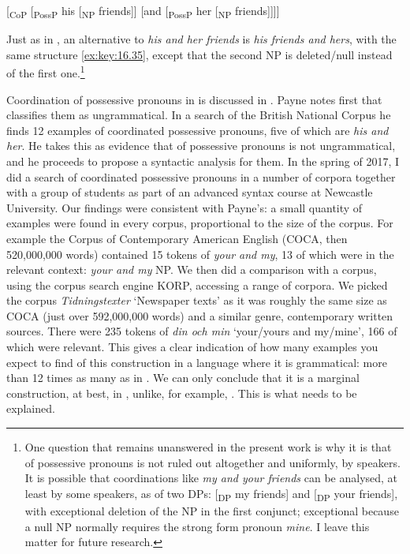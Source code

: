 \documentclass[output=paper]{langsci/langscibook}
\begin{document}
\ea\label{ex:key:16.35}
{}[\textsubscript{CoP} [\textsubscript{PossP} his [\textsubscript{NP} friends]] [and [\textsubscript{PossP} her [\textsubscript{NP} friends]]]]
\z

Just as in , an alternative to \emph{his and her friends} is \emph{his
friends and hers}, with the same structure \eqref{ex:key:16.35}, except that the second NP is
deleted/null instead of the first one.\footnote{ One question that remains
unanswered in the present work is why it is that  of possessive
pronouns is not ruled out altogether and uniformly, by  speakers. It is
possible that coordinations like \emph{my and your friends} can be analysed, at
least by some speakers, as  of two DPs: [\textsubscript{DP} my
friends] and [\textsubscript{DP} your friends], with exceptional deletion of
the NP in the first conjunct; exceptional because a null NP normally requires
the strong form pronoun \emph{mine}. I leave this matter for future research.}

Coordination of possessive pronouns in  is discussed in
\citet{Payne2011}. Payne notes first that \textcite{QuirkEtAl1972} classifies them as
ungrammatical. In a search of the British National Corpus he finds 12 examples
of coordinated possessive pronouns, five of which are \emph{his and her}. He
takes this as evidence that  of possessive pronouns is not
ungrammatical, and he proceeds to propose a syntactic analysis for them. In the
spring of 2017, I did a search of coordinated possessive pronouns in a number
of  corpora together with a group of students as part of an advanced
syntax course at Newcastle University. Our findings were consistent with
Payne’s: a small quantity of examples were found in every corpus, proportional
to the size of the corpus. For example the Corpus of Contemporary American
English (COCA, then 520,000,000 words) contained 15 tokens of \emph{your and
my}, 13 of which were in the relevant context: \emph{your and my} NP. We then
did a comparison with a  corpus, using the corpus search engine KORP,
accessing a range of  corpora. We picked the corpus
\emph{Tidningstexter} `Newspaper texts' as it was roughly the same size as COCA
(just over 592,000,000 words) and a similar genre, contemporary written
sources. There were 235 tokens of \emph{din och min} `your/yours and my/mine',
166 of which were relevant. This gives a clear indication of how many examples
you expect to find of this construction in a language where it is grammatical:
more than 12 times as many as in . We can only conclude that it is a
marginal construction, at best, in , unlike, for example, . This
is what needs to be explained.
\end{document}
